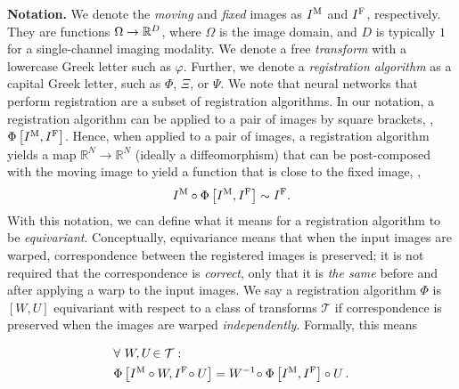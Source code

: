 \noindent
\textbf{Notation.}
\label{section:notation}
We denote the \emph{moving} and \emph{fixed} images as ${I^\text{M}}$ and ${I^\text{F}}$,  respectively. They are functions $\Omega \rightarrow \mathbb{R}^D$, where $\Omega$ is the image domain, and $D$ is typically $1$ for a single-channel imaging modality. We denote a free \emph{transform} with a lowercase Greek letter such as $\varphi$.
Further, we denote a \emph{registration algorithm} as a capital Greek letter, such as $\Phi$, $\Xi$, or $\Psi$. We note that neural networks that perform registration are a subset of registration algorithms.
In our notation, a registration algorithm can be applied to a pair of images by square brackets, \ie, $\Phi\left[{I^\text{M}}, {I^\text{F}}\right]$. 
Hence, when applied to a pair of images, a registration algorithm yields a map $\mathbb{R}^N \rightarrow \mathbb{R}^N$ (ideally a diffeomorphism) that can be post-composed
with the moving image to yield a function that is close to the fixed image, \ie,
\begin{equation}
	{I^\text{M}} \circ \Phi\left[{I^\text{M}}, {I^\text{F}}\right] \sim {I^\text{F}}.
	\label{registration_problem_statement}
\end{equation}
With this notation, we can define what it means for a registration algorithm to be \emph{equivariant}. Conceptually, equivariance means that when the input images are warped, correspondence between the registered images is preserved; it is not required that the correspondence is \emph{correct}, only that it is \emph{the same} before and after applying a warp to the input images. We say a registration algorithm $\Phi$ is \textcolor{blue!75!black}{$[W, U]$ equivariant} with respect to a class of transforms $\mathcal{T}$ if correspondence is preserved when the images are warped \emph{independently}. Formally, this means
\begin{tcolorbox}[top=-2mm,bottom=0mm,boxsep=1mm,colback=blue!5!white,colframe=blue!75!black]
 \begin{align}
		& \forall\ W, U \!\in \mathcal{T}: \label{eqn:WUequiv}                              \\
		& \Phi\left[{I^\text{M}} \circ W, {I^\text{F}}\! \circ U\right] = W^{-1}\! \circ \Phi\left[{I^\text{M}}, {I^\text{F}}\right] \circ U\,.\notag
\end{align}
\end{tcolorbox}
